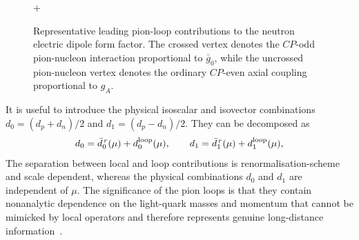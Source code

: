 \documentclass[review]{elsarticle}
\numberwithin{equation}{section}
\numberwithin{table}{section}
\numberwithin{figure}{section}
\begin{document}
\begin{figure}[ht!]
\centering
{}
\qquad + \qquad
{}
\caption{Representative leading pion-loop contributions to the neutron electric dipole form factor. The crossed vertex denotes the $CP$-odd pion-nucleon interaction proportional to $\bar g_0$, while the uncrossed pion-nucleon vertex denotes the ordinary $CP$-even axial coupling proportional to $g_A$. }
\label{fig:edm-pion-loop}
\end{figure}

It is useful to introduce the physical isoscalar and isovector combinations
$d_0=(d_p+d_n)/2$ and $d_1=(d_p-d_n)/2$. They can be decomposed as
\begin{align}
    d_0 = \bar d_0^{\,r}(\mu) + d_0^{\rm loop}(\mu),
    \qquad
    d_1 = \bar d_1^{\,r}(\mu) + d_1^{\rm loop}(\mu),
    \label{eq:nucleon-edm-decomposition}
\end{align}
The separation between local and loop contributions is renormalisation-scheme and scale dependent, whereas the physical combinations $d_0$ and $d_1$ are independent of $\mu$. The significance of the pion loops is that they contain nonanalytic dependence on the light-quark masses and momentum that cannot be mimicked by local operators and therefore represents genuine long-distance information~\cite{Crewther:1979pi,Hockings:2005cn,Mereghetti:2010kp}.
\end{document}
